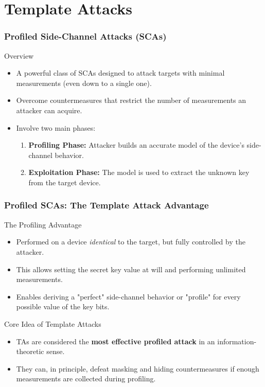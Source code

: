 \section{Template Attacks} %

\begin{frame}
    \frametitle{Profiled Side-Channel Attacks (SCAs)}
    \begin{block}{Overview}
        \begin{itemize}
            \item A powerful class of SCAs designed to attack targets with minimal measurements (even down to a single one).
            \item Overcome countermeasures that restrict the number of measurements an attacker can acquire.
            \item Involve two main phases:
                \begin{enumerate}
                    \item \textbf{Profiling Phase:} Attacker builds an accurate model of the device's side-channel behavior.
                    \item \textbf{Exploitation Phase:} The model is used to extract the unknown key from the target device.
                \end{enumerate}
        \end{itemize}
    \end{block}
\end{frame}

\begin{frame}
    \frametitle{Profiled SCAs: The Template Attack Advantage} %
    \begin{block}{The Profiling Advantage}
        \begin{itemize}
            \item Performed on a device \textit{identical} to the target, but fully controlled by the attacker.
            \item This allows setting the secret key value at will and performing unlimited measurements.
            \item Enables deriving a "perfect" side-channel behavior or "profile" for every possible value of the key bits.
        \end{itemize}
    \end{block}
    \begin{block}{Core Idea of Template Attacks}
        \begin{itemize}
            \item TAs are considered the \textbf{most effective profiled attack }in an information-theoretic sense.
            \item They can, in principle, defeat masking and hiding countermeasures if enough measurements are collected during profiling.
        \end{itemize}
    \end{block}
\end{frame}


